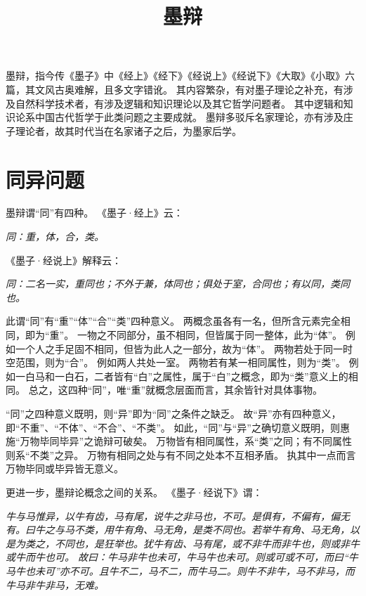 \documentclass[11pt]{article}
\title{墨辩}
\date{}
\begin{document}
  \maketitle
  
  \linenumbers

墨辩，指今传《墨子》中《经上》《经下》《经说上》《经说下》《大取》《小取》六篇，其文风古奥难解，且多文字错讹。
其内容繁杂，有对墨子理论之补充，有涉及自然科学技术者，有涉及逻辑和知识理论以及其它哲学问题者。
其中逻辑和知识论系中国古代哲学于此类问题之主要成就。
\newline
墨辩多驳斥名家理论，亦有涉及庄子理论者，故其时代当在名家诸子之后，为墨家后学。

\section{同异问题}
墨辩谓“同”有四种。
《墨子·经上》云：

\textit{同：重，体，合，类。}

《墨子·经说上》解释云：

\textit{同：二名一实，重同也；不外于兼，体同也；俱处于室，合同也；有以同，类同也。}

此谓“同”有“重”“体”“合”“类”四种意义。
两概念虽各有一名，但所含元素完全相同，即为“重”。
一物之不同部分，虽不相同，但皆属于同一整体，此为“体”。
例如一个人之手足固不相同，但皆为此人之一部分，故为“体”。
两物若处于同一时空范围，则为“合”。
例如两人共处一室。
两物若有某一相同属性，则为“类”。
例如一白马和一白石，二者皆有“白”之属性，属于“白”之概念，即为“类”意义上的相同。
总之，这四种“同”，唯“重”就概念层面而言，其余皆针对具体事物。

\newline

“同”之四种意义既明，则“异”即为“同”之条件之缺乏。
故“异”亦有四种意义，即“不重”、“不体”、“不合”、“不类”。
如此，“同”与“异”之确切意义既明，则惠施“万物毕同毕异”之诡辩可破矣。
万物皆有相同属性，系“类”之同；有不同属性则系“不类”之异。
万物有相同之处与有不同之处本不互相矛盾。
执其中一点而言万物毕同或毕异皆无意义。

\newline

更进一步，墨辩论概念之间的关系。
《墨子·经说下》谓：

\textit{牛与马惟异，以牛有齿，马有尾，说牛之非马也，不可。是俱有，不偏有，偏无有。曰牛之与马不类，用牛有角、马无角，是类不同也。若举牛有角、马无角，以是为类之，不同也，是狂举也。犹牛有齿、马有尾，或不非牛而非牛也，则或非牛或牛而牛也可。
故曰：牛马非牛也未可，牛马牛也未可。则或可或不可，而曰“牛马牛也未可”亦不可。且牛不二，马不二，而牛马二。则牛不非牛，马不非马，而牛马非牛非马，无难。}
\end{document}
